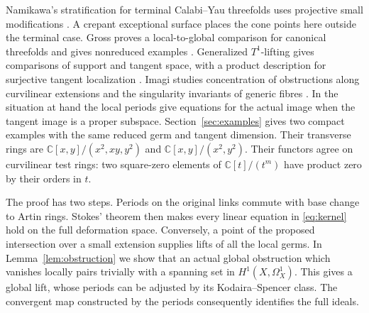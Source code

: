 \documentclass[11pt]{amsart}
\theoremstyle{definition}
\theoremstyle{remark}
\newcommand{\C}{\mathbb C}
\begin{document}
Namikawa's stratification for terminal Calabi--Yau threefolds uses
projective small modifications \cite[Proposition~2.3 and
Theorems~2.5,~2.7]{Nam}. A crepant exceptional surface places the cone
points here outside the terminal case. Gross proves a local-to-global
comparison for canonical threefolds and gives nonreduced examples
\cite[Theorems~1.16,~2.2 and Example~2.19]{Gross}. Generalized
$T^1$-lifting gives comparisons of support and tangent space, with a
product description for surjective tangent localization
\cite[Theorems~3.8,~3.10]{Friedman}. Imagi studies concentration
of obstructions along curvilinear extensions
\cite[Theorem~1.2 and Definition~8.16]{Imagi25} and the singularity
invariants of generic fibres \cite[Theorems~1.7--1.8]{Imagi}. In the situation at hand the local
periods give equations for the actual image when the tangent image is a
proper subspace. Section~\ref{sec:examples} gives two compact examples with the same
reduced germ and tangent dimension. Their transverse rings are
$\C[x,y]/(x^2,xy,y^2)$ and $\C[x,y]/(x^2,y^2)$.
Their functors agree on curvilinear test rings: two square-zero
elements of $\C[t]/(t^m)$ have product zero by their orders in $t$.

The proof has two steps. Periods on the original links commute with
base change to Artin rings. Stokes' theorem then makes every linear
equation in \eqref{eq:kernel} hold on the full deformation space.
Conversely, a point of the proposed intersection over a small extension
supplies lifts of all the local germs. In Lemma~\ref{lem:obstruction}
we show that an actual global
obstruction which vanishes locally pairs trivially with a spanning set
in $H^1(X,\Omega^1_X)$. This gives a global lift, whose periods can be
adjusted by its Kodaira--Spencer class. The convergent map constructed
by the periods consequently identifies the full ideals.






\end{document}
